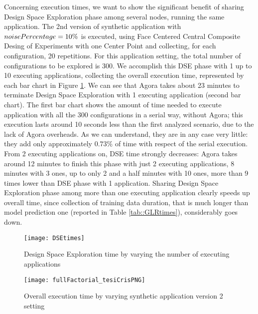 Concerning execution times, we want to show the significant benefit of sharing Design Space Exploration phase among several nodes, running the same application. The 2nd version of synthetic application with $noise\-Percentage = 10\%$ is executed, using Face Centered Central Composite Desing of Experiments with one Center Point and collecting, for each configuration, 20 repetitions. For this application setting, the total number of configurations to be explored is 300. We accomplish this DSE phase with 1 up to 10 executing applications, collecting the overall execution time, represented by each bar chart in Figure \ref{fig::DSEtimes}. We can see that Agora takes about 23 minutes to terminate Design Space Exploration with 1 executing application (second bar chart). The first bar chart shows the amount of time needed to execute application with all the 300 configurations in a serial way, without Agora; this execution lasts around 10 seconds less than the first analyzed scenario, due to the lack of Agora overheads. As we can understand, they are in any case very little: they add only approximately $0.73\%$ of time with respect of the serial execution. From 2 executing applications on, DSE time strongly decreases: Agora takes around 12 minutes to finish this phase with just 2 executing applications, 8 minutes with 3 ones, up to only 2 and a half minutes with 10 ones, more than 9 times lower than DSE phase with 1 application. Sharing Design Space Exploration phase among more than one executing application clearly speeds up overall time, since collection of training data duration, that is much longer than model prediction one (reported in Table \ref{tab::GLRtimes}), considerably goes down.

\begin{figure}[t]
    \centering
    \texttt{[image: DSEtimes]}
    \caption{Design Space Exploration time by varying the number of executing applications}
    \label{fig::DSEtimes}
\end{figure}

\begin{figure}[t]

    \centering
    \texttt{[image: fullFactorial\_tesiCrisPNG]}
    \caption{Overall execution time by varying synthetic application version 2 setting}
    \label{fig::full_cris}
    
\end{figure}

